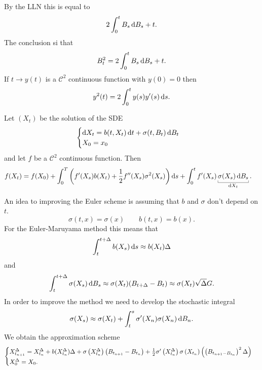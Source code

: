 \documentclass[12pt]{report}
\begin{document}
By the LLN this is equal to
\begin{equation*}
	2\int_{0}^{t}B_s\mathop{}\!\mathrm{d} B_s+t.
\end{equation*}
The conclusion si that
\begin{equation*}
	B_{t}^{2}=2\int_{0}^{t}B_s\mathop{}\!\mathrm{d} B_s+t.
\end{equation*}
If $t\to y(t)$ is a $\mathscr{C}^{2}$ continuous function with $y(0)=0$ then
\begin{equation*}
	y^{2}(t)=2\int_{0}^{t}y(s)y'(s)\mathop{}\!\mathrm{d} s.
\end{equation*}
\begin{theorem}
	Let $(X_{t})$ be the solution of the SDE
	\begin{equation*}
		\begin{cases}
			\mathop{}\!\mathrm{d} X_t=b(t,X_t)\mathop{}\!\mathrm{d} t+\sigma(t,B_t)\mathop{}\!\mathrm{d} B_t\\
			X_0=x_0
		\end{cases}
	\end{equation*}
	and let $f$ be a $\mathscr{C}^{2}$ continuous function. Then
	\begin{align*}
		f(X_{t})&=f(X_{0})+\int_{0}^{T}\left(f'(X_{s})b(X_{t})+\unmezz f''(X_{s})\sigma^{2}(X_{s})\right)\ds+\int_{0}^{t}f'(X_{s})\ubracketthin{\sigma(X_{s})\dif B_s}_{\dif X_{t}}.
	\end{align*}
\end{theorem}
An idea to improving the Euler scheme is assuming that $b$ and $\sigma$ don't depend on $t$.
\begin{equation*}
	\sigma(t,x)=\sigma(x)\qquad b(t,x)=b(x).
\end{equation*}
For the Euler-Maruyama method this means that
\begin{equation*}
	\int_{t}^{t+\Delta}b(X_{s})\mathop{}\!\mathrm{d} s\approx b(X_{t})\Delta
\end{equation*}
and
\begin{equation*}
	\int_{t}^{t+\Delta}\sigma(X_{s})\mathop{}\!\mathrm{d} B_s\approx\sigma(X_{t})(B_{t+\Delta}-B_{t})\approx\sigma(X_{t})\sqrt{\Delta}G.
\end{equation*}
In order to improve the method we need to develop the stochastic integral
\begin{equation*}
	\sigma(X_{s})\approx\sigma(X_{t})+\int_{t}^{s}\sigma'(X_{n})\sigma(X_{n})\mathop{}\!\mathrm{d} B_n.
\end{equation*}
We obtain the approximation scheme
\begin{equation*}
	\begin{cases}
		X^{\Delta}_{t_{n+1}}=X^{\Delta}_{t_{n}}+b(X^{\Delta}_{t_{n}})\Delta+\sigma\left(X^{\Delta}_{t_{n}}\right)\left(B_{t_{n+1}}-B_{t_{n}}\right)+\frac{1}{2}\sigma'\left(X^{\Delta}_{t_{n}}\right)\sigma\left(X_{t_{n}}\right)\left(\left(B_{t_{n+1}-B_{t_{n}}}\right)^{2}\Delta\right)\\
		X_{0}^{\Delta}=X_{0}.
	\end{cases}
\end{equation*}
\end{document}
